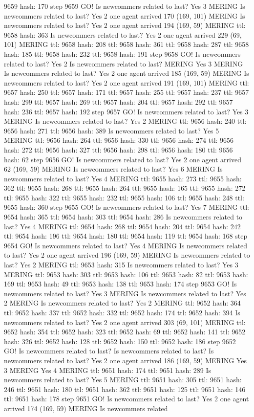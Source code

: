 9659 hash: 170 step 9659 GO! Is newcommers related to last? Yes 3 MERING Is newcommers related to last? Yes 2 one agent arrived 170 (169, 101) MERING Is newcommers related to last? Yes 2 one agent arrived 194 (169, 59) MERING ttl: 9658 hash: 363 Is newcommers related to last? Yes 2 one agent arrived 229 (69, 101) MERING ttl: 9658 hash: 208 ttl: 9658 hash: 361 ttl: 9658 hash: 287 ttl: 9658 hash: 185 ttl: 9658 hash: 232 ttl: 9658 hash: 191 step 9658 GO! Is newcommers related to last? Yes 2 Is newcommers related to last? MERING Yes 3 MERING Is newcommers related to last? Yes 2 one agent arrived 185 (169, 59) MERING Is newcommers related to last? Yes 2 one agent arrived 191 (169, 101) MERING ttl: 9657 hash: 250 ttl: 9657 hash: 171 ttl: 9657 hash: 255 ttl: 9657 hash: 237 ttl: 9657 hash: 299 ttl: 9657 hash: 269 ttl: 9657 hash: 204 ttl: 9657 hash: 292 ttl: 9657 hash: 236 ttl: 9657 hash: 192 step 9657 GO! Is newcommers related to last? Yes 3 MERING Is newcommers related to last? Yes 2 MERING ttl: 9656 hash: 240 ttl: 9656 hash: 271 ttl: 9656 hash: 389 Is newcommers related to last? Yes 5 MERING ttl: 9656 hash: 264 ttl: 9656 hash: 330 ttl: 9656 hash: 274 ttl: 9656 hash: 272 ttl: 9656 hash: 327 ttl: 9656 hash: 298 ttl: 9656 hash: 180 ttl: 9656 hash: 62 step 9656 GO! Is newcommers related to last? Yes 2 one agent arrived 62 (169, 59) MERING Is newcommers related to last? Yes 6 MERING Is newcommers related to last? Yes 4 MERING ttl: 9655 hash: 273 ttl: 9655 hash: 362 ttl: 9655 hash: 268 ttl: 9655 hash: 264 ttl: 9655 hash: 165 ttl: 9655 hash: 272 ttl: 9655 hash: 322 ttl: 9655 hash: 232 ttl: 9655 hash: 106 ttl: 9655 hash: 248 ttl: 9655 hash: 360 step 9655 GO! Is newcommers related to last? Yes 7 MERING ttl: 9654 hash: 365 ttl: 9654 hash: 303 ttl: 9654 hash: 286 Is newcommers related to last? Yes 4 MERING ttl: 9654 hash: 268 ttl: 9654 hash: 204 ttl: 9654 hash: 242 ttl: 9654 hash: 196 ttl: 9654 hash: 180 ttl: 9654 hash: 119 ttl: 9654 hash: 168 step 9654 GO! Is newcommers related to last? Yes 4 MERING Is newcommers related to last? Yes 2 one agent arrived 196 (169, 59) MERING Is newcommers related to last? Yes 2 MERING ttl: 9653 hash: 315 Is newcommers related to last? Yes 3 MERING ttl: 9653 hash: 303 ttl: 9653 hash: 106 ttl: 9653 hash: 82 ttl: 9653 hash: 169 ttl: 9653 hash: 49 ttl: 9653 hash: 138 ttl: 9653 hash: 174 step 9653 GO! Is newcommers related to last? Yes 3 MERING Is newcommers related to last? Yes 2 MERING Is newcommers related to last? Yes 2 MERING ttl: 9652 hash: 364 ttl: 9652 hash: 337 ttl: 9652 hash: 332 ttl: 9652 hash: 174 ttl: 9652 hash: 394 Is newcommers related to last? Yes 2 one agent arrived 303 (69, 101) MERING ttl: 9652 hash: 354 ttl: 9652 hash: 323 ttl: 9652 hash: 69 ttl: 9652 hash: 141 ttl: 9652 hash: 326 ttl: 9652 hash: 128 ttl: 9652 hash: 150 ttl: 9652 hash: 186 step 9652 GO! Is newcommers related to last? Is newcommers related to last? Is newcommers related to last? Yes 2 one agent arrived 186 (169, 59) MERING Yes 3 MERING Yes 4 MERING ttl: 9651 hash: 174 ttl: 9651 hash: 289 Is newcommers related to last? Yes 5 MERING ttl: 9651 hash: 305 ttl: 9651 hash: 246 ttl: 9651 hash: 180 ttl: 9651 hash: 362 ttl: 9651 hash: 125 ttl: 9651 hash: 146 ttl: 9651 hash: 178 step 9651 GO! Is newcommers related to last? Yes 2 one agent arrived 174 (169, 59) MERING Is newcommers related 